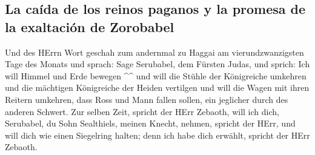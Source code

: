 \hypertarget{la-cauxedda-de-los-reinos-paganos-y-la-promesa-de-la-exaltaciuxf3n-de-zorobabel}{%
\subsection{La caída de los reinos paganos y la promesa de la exaltación
de
Zorobabel}\label{la-cauxedda-de-los-reinos-paganos-y-la-promesa-de-la-exaltaciuxf3n-de-zorobabel}}

 Und des HErrn Wort geschah zum andernmal zu Haggai am
vierundzwanzigsten Tage des Monats und sprach:  Sage
Serubabel, dem Fürsten Judas, und sprich: Ich will Himmel und Erde
bewegen \^{}\^{}  und will die Stühle der Königreiche
umkehren und die mächtigen Königreiche der Heiden vertilgen und will die
Wagen mit ihren Reitern umkehren, dass Ross und Mann fallen sollen, ein
jeglicher durch des anderen Schwert.  Zur selben Zeit,
spricht der HErr Zebaoth, will ich dich, Serubabel, du Sohn Sealthiels,
meinen Knecht, nehmen, spricht der HErr, und will dich wie einen
Siegelring halten; denn ich habe dich erwählt, spricht der HErr Zebaoth.

